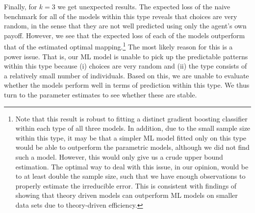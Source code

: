 \documentclass[11pt,a4paper]{article}
\theoremstyle{definition}
\begin{document}
Finally, for \(k=3\) we get unexpected results. The expected loss of the naive benchmark for all of the models within this type reveals that choices are very random, in the sense that they are not well predicted using only the agent's own payoff. However, we see that the expected loss of each of the models outperform that of the estimated optimal mapping.\footnote{Note that this result is robust to fitting a distinct gradient boosting classifier within each type of all three models. In addition, due to the small sample size within this type, it may be that a simpler ML model fitted only on this type would be able to outperform the parametric models, although we did not find such a model. However, this would only give us a crude upper bound estimation. The optimal way to deal with this issue, in our opinion, would be to at least double the sample size, such that we have enough observations to properly estimate the irreducible error. This is consistent with findings of \cite{Peterson2021} showing that theory driven models can outperform ML models on smaller data sets due to theory-driven efficiency.} The most likely reason for this is a power issue. That is, our ML model is unable to pick up the predictable patterns within this type because (i) choices are very random and (ii) the type consists of a relatively small number of individuals. Based on this, we are unable to evaluate whether the models perform well in terms of prediction within this type. We thus turn to the parameter estimates to see whether these are stable.
\end{document}
